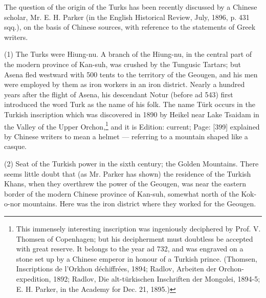 
The question of the origin of the Turks has been recently discussed by a Chinese scholar, Mr. E. H. Parker (in the English Historical Review, July, 1896, p. 431 sqq.), on the basis of Chinese sources, with reference to the statements of Greek writers.

(1) The Turks were Hiung-nu. A branch of the Hiung-nu, in the central part of the modern province of Kan-suh, was crushed by the Tungusic Tartars; but Asena fled westward with 500 tents to the territory of the Geougen, and his men were employed by them as iron workers in an iron district. Nearly a hundred years after the flight of Asena, his descendant Notur (before ad 543) first introduced the word Turk as the name of his folk. The name Türk occurs in the Turkish inscription which was discovered in 1890 by Heikel near Lake Tsaidam in the Valley of the Upper Orchon,\footnote{This immensely interesting inscription was ingeniously deciphered by Prof. V. Thomsen of Copenhagen; but his decipherment must doubtless be accepted with great reserve. It belongs to the year ad 732, and was engraved on a stone set up by a Chinese emperor in honour of a Turkish prince. (Thomsen, Inscriptions de l\texthebrew{}’Orkhon déchiffrées, 1894; Radlov, Arbeiten der Orchon-expedition, 1892; Radlov, Die alt-türkischen Inschriften der Mongolei, 1894-5; E. H. Parker, in the Academy for Dec. 21, 1895.)} and it is Edition: current; Page: [399] explained by Chinese writers to mean a helmet \texthebrew{—} referring to a mountain shaped like a casque.

(2) Seat of the Turkish power in the sixth century; the Golden Mountains. There seems little doubt that (as Mr. Parker has shown) the residence of the Turkish Khans, when they overthrew the power of the Geougen, was near the eastern border of the modern Chinese province of Kan-suh, somewhat north of the Kok-o-nor mountains. Here was the iron district where they worked for the Geougen.

